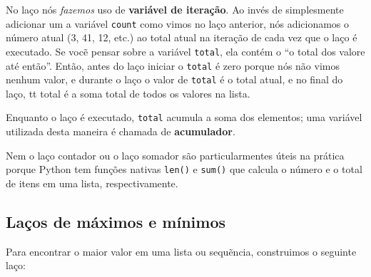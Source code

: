 No laço nós \emph{fazemos} uso de {\bf variável de iteração}. Ao invés de
simplesmente adicionar um a variável {\tt count} como vimos no laço anterior,
nós adicionamos o número atual (3, 41, 12, etc.) ao total atual na iteração
de cada vez que o laço é executado. Se vocẽ pensar sobre a variável
{\tt total}, ela contém o ``o total dos valore até então''. Então, antes do
laço iniciar o {\tt total} é zero porque nós não vimos nenhum valor, e durante
o laço o valor de {\tt total} é o total atual, e no final do laço, {tt total}
é a soma total de todos os valores na lista.


Enquanto o laço é executado, {\tt total} acumula a soma dos elementos; uma
variável utilizada desta maneira é chamada de {\bf acumulador}.


Nem o laço contador ou o laço somador são particularmentes úteis na prática
porque Python tem funções nativas {\tt len()} e {\tt sum()} que calcula o
número e o total de itens em uma lista, respectivamente.

\subsection{Laços de máximos e mínimos}

\label{maximumloop}


Para encontrar o maior valor em uma lista ou sequẽncia, construimos o seguinte
laço:

